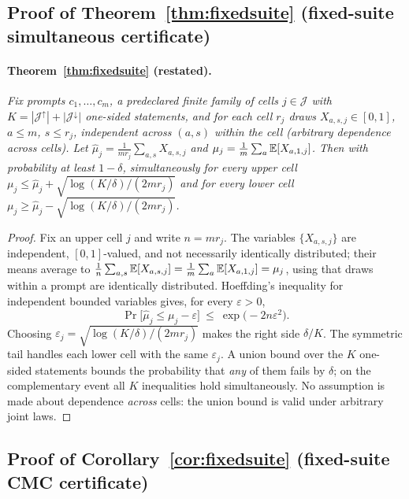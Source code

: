 \subsection{Proof of Theorem~\ref{thm:fixedsuite} (fixed-suite simultaneous certificate)}
\label{app:proofs:stat}

\paragraph{Theorem~\ref{thm:fixedsuite} (restated).}
\emph{Fix prompts $c_{1},\dots,c_{m}$, a predeclared finite family of cells
$j\in\mathcal{J}$ with $K=|\mathcal{J}^{\uparrow}|+|\mathcal{J}^{\downarrow}|$ one-sided
statements, and for each cell $r_{j}$ draws
$X_{a,s,j}\in[0,1]$, $a\le m$, $s\le r_{j}$, independent across $(a,s)$ within the cell
(arbitrary dependence across cells). Let
$\hat\mu_{j}=\frac{1}{mr_{j}}\sum_{a,s}X_{a,s,j}$ and
$\mu_{j}=\frac{1}{m}\sum_{a}\mathbb{E}[X_{a,1,j}]$. Then with probability at least $1-\delta$,
simultaneously for every upper cell
$\mu_{j}\le\hat\mu_{j}+\sqrt{\log(K/\delta)/(2mr_{j})}$ and for every lower cell
$\mu_{j}\ge\hat\mu_{j}-\sqrt{\log(K/\delta)/(2mr_{j})}$.}

\begin{proof}
Fix an upper cell $j$ and write $n=mr_{j}$. The variables
$\{X_{a,s,j}\}$ are independent, $[0,1]$-valued, and not necessarily identically distributed;
their means average to
$\frac{1}{n}\sum_{a,s}\mathbb{E}[X_{a,s,j}]=\frac{1}{m}\sum_{a}\mathbb{E}[X_{a,1,j}]=\mu_{j}$, using that
draws within a prompt are identically distributed. Hoeffding's inequality for independent bounded
variables gives, for every $\varepsilon>0$,
\[
\Pr\big[\hat\mu_{j}\le\mu_{j}-\varepsilon\big]\ \le\ \exp\!\big(-2n\varepsilon^{2}\big).
\]
Choosing $\varepsilon_{j}=\sqrt{\log(K/\delta)/(2mr_{j})}$ makes the right side $\delta/K$. The
symmetric tail handles each lower cell with the same $\varepsilon_{j}$. A union bound over the $K$
one-sided statements bounds the probability that \emph{any} of them fails by $\delta$; on the
complementary event all $K$ inequalities hold simultaneously. No assumption is made about
dependence \emph{across} cells: the union bound is valid under arbitrary joint laws.
\end{proof}

\subsection{Proof of Corollary~\ref{cor:fixedsuite} (fixed-suite CMC certificate)}
\label{app:proofs:fixedsuite-cor}


